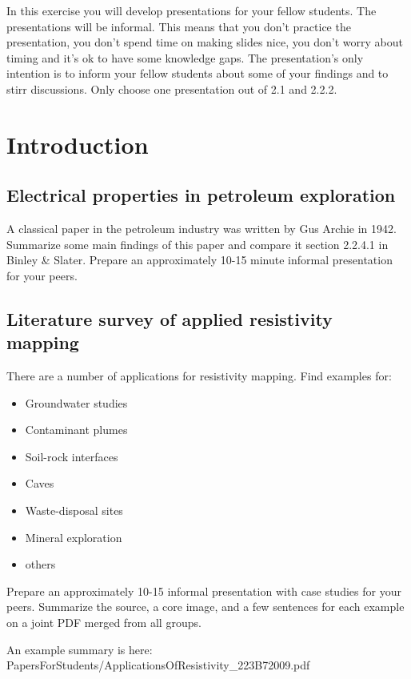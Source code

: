 \begin{tcolorbox}[enhanced jigsaw,breakable,pad at break*=1mm,
    colback=blue!5!white,colframe=babyblueeyes,title=Informal Presentations]
    In this exercise you will develop presentations for your fellow students. The presentations will be informal. This means that you don't practice the presentation, you don't spend time on making slides nice, you don't worry about timing and it's ok to have some knowledge gaps. The presentation's only intention is to inform your fellow students about some of your findings and to stirr discussions. Only choose one presentation out of 2.1 and 2.2.2.      
\end{tcolorbox}
\section{Introduction}

\subsection{Electrical properties in petroleum exploration}
A classical paper in the petroleum industry was written by Gus Archie in 1942. Summarize some main findings of this paper and compare it section 2.2.4.1 in Binley \& Slater. Prepare an approximately 10-15 minute informal presentation for your peers.

\subsection{Literature survey of applied resistivity mapping}

There are a number of applications for resistivity mapping. Find examples for:
\begin{itemize}
    \item Groundwater studies
    \item Contaminant plumes
    \item Soil-rock interfaces
    \item Caves
    \item Waste-disposal sites
    \item Mineral exploration
    \item others
\end{itemize}
Prepare an approximately 10-15 informal presentation with case studies for your peers. Summarize the source, a core image, and a few sentences for each example on a joint PDF merged from all groups.


\ifanswers
    \begin{tcolorbox}[enhanced jigsaw,breakable,pad at break*=1mm,
    colback=blue!5!white,colframe=babyblueeyes,title=Solutions,
    watermark color=white]
    An example summary is here: PapersForStudents/ApplicationsOfResistivity\_223B7\-2009.pdf
    
    \end{tcolorbox}
\fi